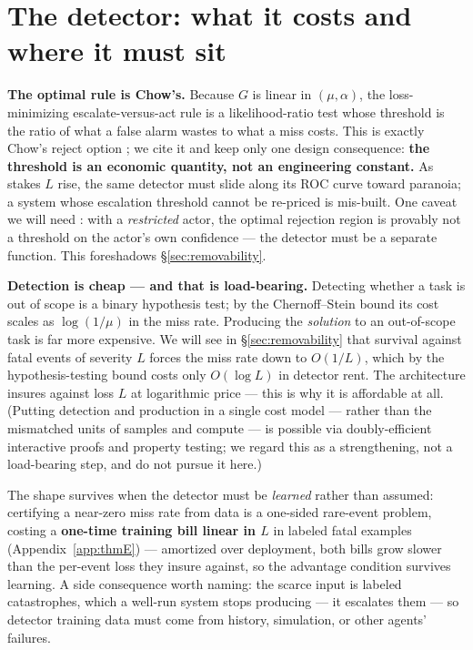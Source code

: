 \documentclass[11pt]{article}
\theoremstyle{plain}
\theoremstyle{definition}
\begin{document}
\section{The detector: what it costs and where it must sit}\label{sec:detector}

\textbf{The optimal rule is Chow's.} Because $G$ is linear in $(\mu, \alpha)$, the
loss-minimizing escalate-versus-act rule is a likelihood-ratio test whose
threshold is the ratio of what a false alarm wastes to what a miss costs. This
is exactly Chow's reject option \citep{chow1957,chow1970}; we cite it and keep only one
design consequence: \textbf{the threshold is an economic quantity, not an
engineering constant.} As stakes $L$ rise, the same detector must slide along
its ROC curve toward paranoia; a system whose escalation threshold cannot be
re-priced is mis-built. One caveat we will need \citep{cortes2016}: with a \emph{restricted} actor, the optimal rejection region is provably not
a threshold on the actor's own confidence --- the detector must be a separate
function. This foreshadows \S\ref{sec:removability}.

\textbf{Detection is cheap --- and that is load-bearing.} Detecting whether a task is
out of scope is a binary hypothesis test; by the Chernoff--Stein bound
\citep[Thm.~11.8.3]{coverthomas2006} its cost
scales as $\log(1/\mu)$ in the miss rate. Producing the \emph{solution} to an
out-of-scope task is far more expensive. We will see in \S\ref{sec:removability} that survival
against fatal events of severity $L$ forces the miss rate down to $O(1/L)$,
which by the hypothesis-testing bound costs only $O(\log L)$ in detector rent.
The architecture insures against loss $L$ at logarithmic price --- this is why
it is affordable at all. (Putting detection and production in a single cost
model --- rather than the mismatched units of samples and compute --- is possible
via doubly-efficient interactive proofs and property testing; we regard this
as a strengthening, not a load-bearing step, and do not pursue it here.)

The shape survives when the detector must be
\emph{learned} rather than assumed: certifying a near-zero miss rate from data is
a one-sided rare-event problem, costing a \textbf{one-time training bill linear in
$L$} in labeled fatal examples (Appendix~\ref{app:thmE}) --- amortized over deployment,
both bills grow slower than the per-event loss they insure against, so the
advantage condition survives learning. A side consequence worth naming: the
scarce input is labeled catastrophes, which a well-run system stops producing
--- it escalates them --- so detector training data must come from history,
simulation, or other agents' failures.
\end{document}
